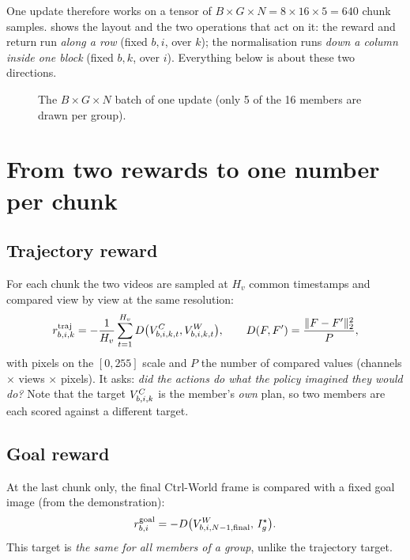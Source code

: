One update therefore works on a tensor of $B\times G\times N=8\times16\times5=640$ chunk samples.  shows the layout and the two operations that act on it: the reward and return run \emph{along a row} (fixed $b,i$, over $k$); the normalisation runs \emph{down a column inside one block} (fixed $b,k$, over $i$). Everything below is about these two directions.

\begin{figure}[t]
\centering

\caption{The $B\times G\times N$ batch of one update (only 5 of the 16 members are drawn per group).}
\label{loop:fig:tensor}
\end{figure}

\section{From two rewards to one number per chunk}

\subsection{Trajectory reward }
For each chunk the two videos are sampled at $H_v$ common timestamps and compared view by view at the same resolution:
\begin{equation}
r^{\mathrm{traj}}_{b,i,k}=-\frac1{H_v}\sum_{t=1}^{H_v}D\big(V^{C}_{b,i,k,t},V^{W}_{b,i,k,t}\big),\qquad
D(F,F')=\frac{\|F-F'\|_2^2}{P},
\label{loop:eq:traj}
\end{equation}
with pixels on the $[0,255]$ scale and $P$ the number of compared values (channels $\times$ views $\times$ pixels). It asks: \emph{did the actions do what the policy imagined they would do?} Note that the target $V^{C}_{b,i,k}$ is the member's \emph{own} plan, so two members are each scored against a different target.

\subsection{Goal reward }
At the last chunk only, the final Ctrl-World frame is compared with a fixed goal image (from the demonstration):
\begin{equation}
r^{\mathrm{goal}}_{b,i}=-D\big(V^{W}_{b,i,N-1,\mathrm{final}},\,I^\star_{g}\big).
\end{equation}
This target is \emph{the same for all members of a group}, unlike the trajectory target.

